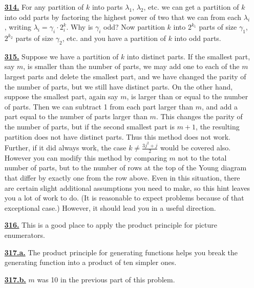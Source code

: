 \documentclass[10pt,]{book}
\theoremstyle{plain}
\theoremstyle{definition}
\theoremstyle{definition}
\theoremstyle{definition}
\numberwithin{equation}{chapter}
\begin{document}
\begin{itemize}[itemsep=1em]
\hypertarget{a-314}{}\item[\textbf{\hyperref[activity-307]{314.}}]
\hypertarget{p-1555}{}%
For any partition of \(k\) into parts \(\lambda_1\), \(\lambda_2\), etc. we can get a partition of \(k\) into odd parts by factoring the highest power of two that we can from each \(\lambda_i\), writing \(\lambda_i = \gamma_i\cdot 2^k_i\).  Why is \(\gamma_i\) odd? Now partition \(k\) into \(2^{k_1}\) parts of size \(\gamma_1\), \(2^{k_2}\) parts of size \(\gamma_2\), etc. and you have a partition of \(k\) into odd parts.%

\hypertarget{a-315}{}\item[\textbf{\hyperref[activity-308]{315.}}]
\hypertarget{p-1559}{}%
Suppose we have a partition of \(k\) into distinct parts. If the smallest part, say \(m\), is smaller than the number of parts, we may add one to each of the \(m\) largest parts and delete the smallest part, and we have changed the parity of the number of parts, but we still have distinct parts. On the other hand, suppose the smallest part, again say \(m\), is larger than or equal to the number of parts. Then we can subtract 1 from each part larger than \(m\), and add a part equal to the number of parts larger than \(m\). This changes the parity of the number of parts, but if the second smallest part is \(m+1\), the resulting partition does not have distinct parts. Thus this method does not work. Further, if it did always work, the case \(k \ne \frac{3j^2+j}{2}\) would be covered also. However you can modify this method by comparing \(m\) not to the total number of parts, but to the number of rows at the top of the Young diagram that differ by exactly one from the row above. Even in this situation, there are certain slight additional assumptions you need to make, so this hint leaves you a lot of work to do. (It is reasonable to expect problems because of that exceptional case.) However, it should lead you in a useful direction.%

\hypertarget{a-316}{}\item[\textbf{\hyperref[change-making]{316.}}]
\hypertarget{p-1566}{}%
This is a good place to apply the product principle for picture enumerators.%

\hypertarget{a-317.a}{}\item[\textbf{\hyperref[task-271]{317.a.}}]
\hypertarget{p-1572}{}%
The product principle for generating functions helps you break the generating function into a product of ten simpler ones.%

\hypertarget{a-317.b}{}\item[\textbf{\hyperref[largestpartatmostm]{317.b.}}]
\hypertarget{p-1575}{}%
\(m\) was 10 in the previous part of this problem.%


\end{itemize}
\end{document}

